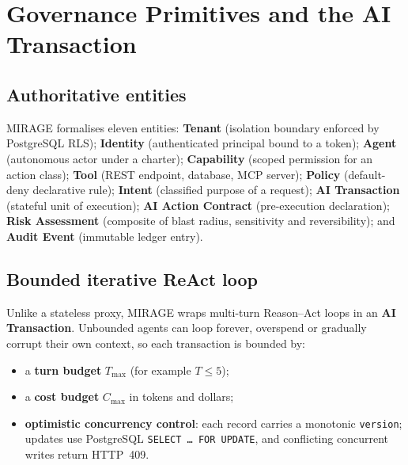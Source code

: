 \documentclass[11pt,a4paper]{article}
\begin{document}
\section{Governance Primitives and the AI Transaction}

\subsection{Authoritative entities}
MIRAGE formalises eleven entities: \textbf{Tenant} (isolation boundary enforced by PostgreSQL RLS); \textbf{Identity} (authenticated principal bound to a token); \textbf{Agent} (autonomous actor under a charter); \textbf{Capability} (scoped permission for an action class); \textbf{Tool} (REST endpoint, database, MCP server); \textbf{Policy} (default-deny declarative rule); \textbf{Intent} (classified purpose of a request); \textbf{AI Transaction} (stateful unit of execution); \textbf{AI Action Contract} (pre-execution declaration); \textbf{Risk Assessment} (composite of blast radius, sensitivity and reversibility); and \textbf{Audit Event} (immutable ledger entry).

\subsection{Bounded iterative ReAct loop}
Unlike a stateless proxy, MIRAGE wraps multi-turn Reason--Act loops \cite{yao2023react} in an \textbf{AI Transaction}. Unbounded agents can loop forever, overspend or gradually corrupt their own context, so each transaction is bounded by:
\begin{itemize}[leftmargin=*,itemsep=1pt]
  \item a \textbf{turn budget} $T_{\max}$ (for example $T\le 5$);
  \item a \textbf{cost budget} $C_{\max}$ in tokens and dollars;
  \item \textbf{optimistic concurrency control}: each record carries a monotonic \texttt{version}; updates use PostgreSQL \texttt{SELECT \dots{} FOR UPDATE}, and conflicting concurrent writes return HTTP~409.
\end{itemize}
\end{document}

